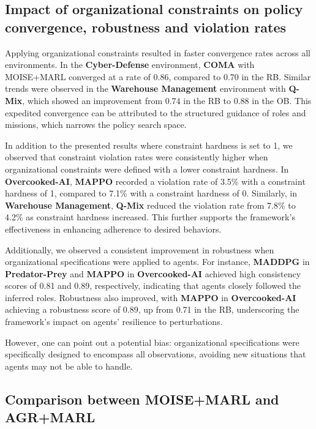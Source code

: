 \documentclass[conference]{IEEEtran}
\begin{document}
\subsection{Impact of organizational constraints on policy convergence, robustness and violation rates}

Applying organizational constraints resulted in faster convergence rates across all environments. In the \textbf{Cyber-Defense} environment, \textbf{COMA} with MOISE+MARL converged at a rate of 0.86, compared to 0.70 in the RB. Similar trends were observed in the \textbf{Warehouse Management} environment with \textbf{Q-Mix}, which showed an improvement from 0.74 in the RB to 0.88 in the OB. This expedited convergence can be attributed to the structured guidance of roles and missions, which narrows the policy search space.

In addition to the presented results where constraint hardness is set to 1, we observed that constraint violation rates were consistently higher when organizational constraints were defined with a lower constraint hardness. In \textbf{Overcooked-AI}, \textbf{MAPPO} recorded a violation rate of 3.5\% with a constraint hardness of 1, compared to 7.1\% with a constraint hardness of 0. Similarly, in \textbf{Warehouse Management}, \textbf{Q-Mix} reduced the violation rate from 7.8\% to 4.2\% as constraint hardness increased. This further supports the framework's effectiveness in enhancing adherence to desired behaviors.

Additionally, we observed a consistent improvement in robustness when organizational specifications were applied to agents. For instance, \textbf{MADDPG} in \textbf{Predator-Prey} and \textbf{MAPPO} in \textbf{Overcooked-AI} achieved high consistency scores of 0.81 and 0.89, respectively, indicating that agents closely followed the inferred roles. Robustness also improved, with \textbf{MAPPO} in \textbf{Overcooked-AI} achieving a robustness score of 0.89, up from 0.71 in the RB, underscoring the framework's impact on agents' resilience to perturbations.

However, one can point out a potential bias: organizational specifications were specifically designed to encompass all observations, avoiding new situations that agents may not be able to handle.


\subsection{Comparison between MOISE+MARL and AGR+MARL}
\end{document}
